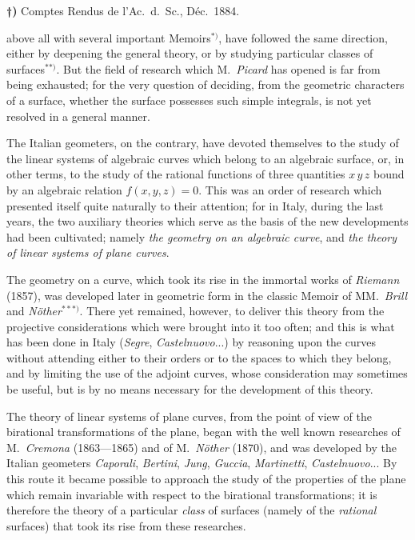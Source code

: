 \documentclass{article}
\begin{document}
\textbf{†)} Comptes Rendus de l'Ac.\ d.\ Sc., Déc.\ 1884.

above all with several important Memoirs${}^{*)}$, have followed the same direction, either by deepening the general theory, or by studying particular classes of surfaces${}^{**)}$. But the field of research which M.\ \emph{Picard} has opened is far from being exhausted; for the very question of deciding, from the geometric characters of a surface, whether the surface possesses such simple integrals, is not yet resolved in a general manner.

The Italian geometers, on the contrary, have devoted themselves to the study of the linear systems of algebraic curves which belong to an algebraic surface, or, in other terms, to the study of the rational functions of three quantities $x\,y\,z$ bound by an algebraic relation $f(x, y, z) = 0$. This was an order of research which presented itself quite naturally to their attention; for in Italy, during the last years, the two auxiliary theories which serve as the basis of the new developments had been cultivated; namely \emph{the geometry on an algebraic curve}, and \emph{the theory of linear systems of plane curves}.

The geometry on a curve, which took its rise in the immortal works of \emph{Riemann} (1857), was developed later in geometric form in the classic Memoir of MM.\ \emph{Brill} and \emph{Nöther}${}^{***)}$. There yet remained, however, to deliver this theory from the projective considerations which were brought into it too often; and this is what has been done in Italy (\emph{Segre}, \emph{Castelnuovo}...) by reasoning upon the curves without attending either to their orders or to the spaces to which they belong, and by limiting the use of the adjoint curves, whose consideration may sometimes be useful, but is by no means necessary for the development of this theory.

The theory of linear systems of plane curves, from the point of view of the birational transformations of the plane, began with the well known researches of M.\ \emph{Cremona} (1863---1865) and of M.\ \emph{Nöther} (1870), and was developed by the Italian geometers \emph{Caporali}, \emph{Bertini}, \emph{Jung}, \emph{Guccia}, \emph{Martinetti}, \emph{Castelnuovo}... By this route it became possible to approach the study of the properties of the plane which remain invariable with respect to the birational transformations; it is therefore the theory of a particular \emph{class} of surfaces (namely of the \emph{rational} surfaces) that took its rise from these researches.
\end{document}
